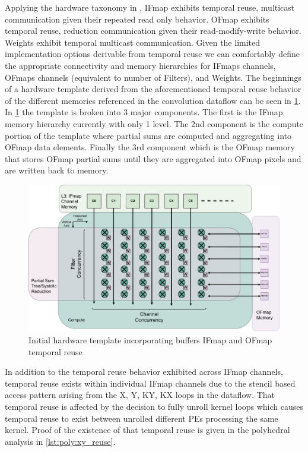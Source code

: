 Applying the hardware taxonomy in \cite{maestro}, IFmap exhibits temporal reuse,
multicast communication given their repeated read only behavior. OFmap exhibits temporal reuse, reduction communication
given their read-modify-write behavior. Weights exhibit temporal multicast
communication. Given the limited implementation options derivable from temporal
reuse we can comfortably define the appropriate connectivity and memory
hierarchies for IFmaps channels, OFmaps channels (equivalent to number of
Filters), and Weights. The beginnings of a hardware template derived from the
aforementioned temporal reuse behavior of the different memories referenced in
the convolution dataflow can be seen in \ref{fig:reuse_illus}. In
\ref{fig:reuse_illus} the template is broken into 3 major components. The first
is the IFmap memory hierarchy currently with only 1 level. The 2nd component is
the compute portion of the template where partial sums are computed and
aggregating into OFmap data elements. Finally the 3rd component which is the
OFmap memory that stores OFmap partial sums until they are aggregated into OFmap
pixels and are written back to memory.

\begin{figure}[]
    \centering
    \includegraphics[scale=0.4]{fig/reuse_illus.pdf}
    \caption{Initial hardware template incorporating buffers IFmap and OFmap temporal reuse}
    \label{fig:reuse_illus}
\end{figure}

In addition to the temporal reuse behavior exhibited across IFmap channels,
temporal reuse exists within individual IFmap channels due to the stencil based
access pattern arising from the X, Y, KY, KX loops in the dataflow. That
temporal reuse is affected by the decision to fully unroll kernel loops which
causes temporal reuse to exist between unrolled different PEs processing the
same kernel. Proof of the existence of that temporal reuse is given in the polyhedral analysis in
\autoref{lst:poly:xy_reuse}. 

